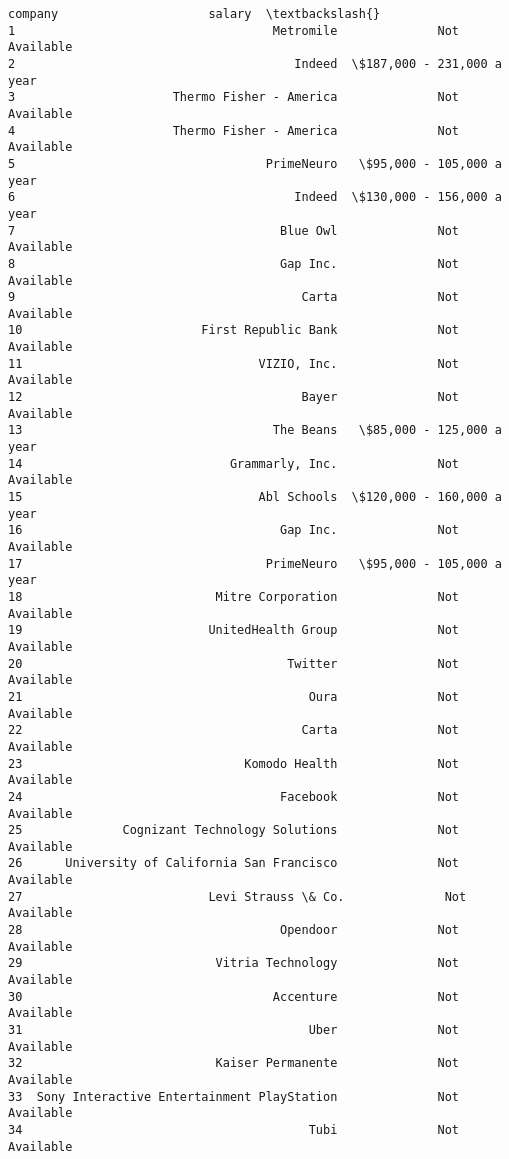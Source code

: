 \documentclass[11pt]{article}
\begin{document}
\begin{tcolorbox}[breakable, size=fbox, boxrule=.5pt, pad at break*=1mm, opacityfill=0]
\begin{Verbatim}[commandchars=\\\{\}]
                                       company                     salary  \textbackslash{}
1                                    Metromile              Not Available
2                                       Indeed  \$187,000 - 231,000 a year
3                      Thermo Fisher - America              Not Available
4                      Thermo Fisher - America              Not Available
5                                   PrimeNeuro   \$95,000 - 105,000 a year
6                                       Indeed  \$130,000 - 156,000 a year
7                                     Blue Owl              Not Available
8                                     Gap Inc.              Not Available
9                                        Carta              Not Available
10                         First Republic Bank              Not Available
11                                 VIZIO, Inc.              Not Available
12                                       Bayer              Not Available
13                                   The Beans   \$85,000 - 125,000 a year
14                             Grammarly, Inc.              Not Available
15                                 Abl Schools  \$120,000 - 160,000 a year
16                                    Gap Inc.              Not Available
17                                  PrimeNeuro   \$95,000 - 105,000 a year
18                           Mitre Corporation              Not Available
19                          UnitedHealth Group              Not Available
20                                     Twitter              Not Available
21                                        Oura              Not Available
22                                       Carta              Not Available
23                               Komodo Health              Not Available
24                                    Facebook              Not Available
25              Cognizant Technology Solutions              Not Available
26      University of California San Francisco              Not Available
27                          Levi Strauss \& Co.              Not Available
28                                    Opendoor              Not Available
29                           Vitria Technology              Not Available
30                                   Accenture              Not Available
31                                        Uber              Not Available
32                           Kaiser Permanente              Not Available
33  Sony Interactive Entertainment PlayStation              Not Available
34                                        Tubi              Not Available

\end{Verbatim}
\end{tcolorbox}
\end{document}
